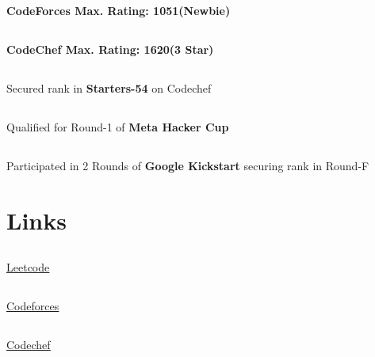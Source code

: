 \documentclass[a4paper,11pt]{article}
\begin{document}
\subsection{}\hspace{0.5em}\textbf{CodeForces Max. Rating: 1051(Newbie)}
\subsection{}\hspace{0.5em}\textbf{CodeChef Max. Rating: 1620(3 Star) }
\subsection{}\hspace{0.5em}Secured \textbf{} rank in \textbf{Starters-54} on Codechef
\subsection{}\hspace{0.5em}Qualified for Round-1 of \textbf{Meta Hacker Cup}
\subsection{}\hspace{0.5em}Participated in 2 Rounds of \textbf{Google Kickstart} securing 
\textbf{} rank in Round-F

\vspace{-1.1em}

\section{Links}

\subsection{}\hspace{0.5em}
\underline{\href{https://leetcode.com/aksnaresh/}{Leetcode}}
\subsection{}\hspace{0.5em}
\underline{\href{https://codeforces.com/profile/aksnaresh}{Codeforces}}
\subsection{}\hspace{0.5em}
\underline{\href{https://www.codechef.com/users/aksnaresh}{Codechef}}
\end{document}
